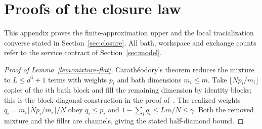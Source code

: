 \section{Proofs of the closure law}\label{app:closure-proofs}

This appendix proves the finite-approximation upper and the local
tracialization converse stated in Section~\ref{sec:closure}.
All bath, workspace and exchange counts refer to the service
contract of Section~\ref{sec:model}.

\begin{proof}[Proof of Lemma~\ref{lem:mixture-flat}]
Carath\'eodory's theorem reduces the mixture to $L\le d^4+1$ terms with weights $p_i$ and bath dimensions $m_i\le m$.
Take $\lfloor Np_i/m_i\rfloor$ copies of the $i$th bath block and fill the remaining dimension by identity blocks; this is the block-diagonal
construction in the proof of~\cite[Theorem~3.6]{HaagerupMusat2015}.
The realized weights $q_i=m_i\lfloor Np_i/m_i\rfloor/N$ obey $q_i\le p_i$ and
$1-\sum_iq_i\le Lm/N\le\gamma$. Both the removed mixture and the filler are channels, giving the stated half-diamond bound.
\end{proof}

